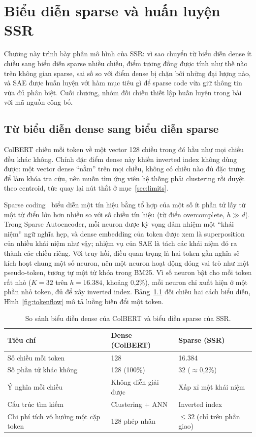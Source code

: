 \documentclass[a4paper,13pt]{extreport}
\theoremstyle{plain}
\newcommand{\ssr}{SSR}
\begin{document}
\chapter{Biểu diễn sparse và huấn luyện SSR}
\label{ch:sparse}

Chương này trình bày phần mô hình của \ssr: vì sao chuyển từ biểu diễn dense ít chiều sang biểu diễn sparse nhiều chiều, điểm tương đồng được tính như thế nào trên không gian sparse, sai số so với điểm dense bị chặn bởi những đại lượng nào, và SAE được huấn luyện với hàm mục tiêu gì để sparse code vừa giữ thông tin vừa đủ phân biệt. Cuối chương, nhóm đối chiếu thiết lập huấn luyện trong bài với mã nguồn công bố.

\section{Từ biểu diễn dense sang biểu diễn sparse}
ColBERT chiếu mỗi token về một vector 128 chiều trong đó hầu như mọi chiều đều khác không. Chính đặc điểm dense này khiến inverted index không dùng được: một vector dense ``nằm'' trên mọi chiều, không có chiều nào đủ đặc trưng để làm khóa tra cứu, nên muốn tìm ứng viên hệ thống phải clustering rồi duyệt theo centroid, tức quay lại nút thắt ở mục~\ref{sec:limits}.

Sparse coding~\cite{lee2006} biểu diễn một tín hiệu bằng tổ hợp của một số ít phần tử lấy từ một từ điển lớn hơn nhiều so với số chiều tín hiệu (từ điển overcomplete, $h\gg d$). Trong Sparse Autoencoder, mỗi neuron được kỳ vọng đảm nhiệm một ``khái niệm'' ngữ nghĩa hẹp, và dense embedding của token được xem là superposition của nhiều khái niệm như vậy; nhiệm vụ của SAE là tách các khái niệm đó ra thành các chiều riêng. Với truy hồi, điều quan trọng là hai token gần nghĩa sẽ kích hoạt chung một số neuron, nên một neuron hoạt động đóng vai trò như một pseudo-token, tương tự một từ khóa trong BM25. Vì số neuron bật cho mỗi token rất nhỏ ($K=32$ trên $h=16.384$, khoảng 0,2\%), mỗi neuron chỉ xuất hiện ở một phần nhỏ token, đủ để xây inverted index. Bảng~\ref{tab:dense-sparse} đối chiếu hai cách biểu diễn, Hình~\ref{fig:tokenflow} mô tả luồng biến đổi một token.

\begin{table}[htbp]
\centering
\caption{So sánh biểu diễn dense của ColBERT và biểu diễn sparse của \ssr.}
\label{tab:dense-sparse}
\small
\begin{tabular}{p{5.2cm}p{3.6cm}p{4.4cm}}
\toprule
\textbf{Tiêu chí} & \textbf{Dense (ColBERT)} & \textbf{Sparse (\ssr)}\\
\midrule
Số chiều mỗi token & 128 & 16.384\\
Số phần tử khác không & 128 (100\%) & 32 ($\approx$0,2\%)\\
Ý nghĩa mỗi chiều & Không diễn giải được & Xấp xỉ một khái niệm\\
Cấu trúc tìm kiếm & Clustering + ANN & Inverted index\\
Chi phí tích vô hướng một cặp token & 128 phép nhân & $\le 32$ (chỉ trên phần giao)\\
\bottomrule
\end{tabular}
\end{table}
\end{document}
